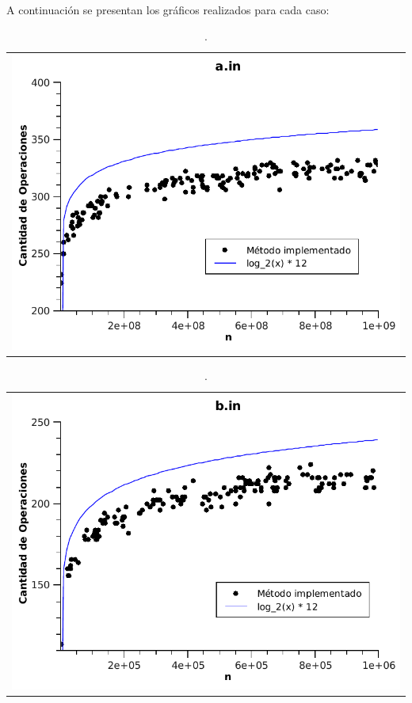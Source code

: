 \paragraph{}
A continuación se presentan los gráficos realizados para cada caso:

	\begin{table}[h!]
		\centering 
			\begin{tabular}{c}
				\includegraphics[scale = 0.8]{./../ej1/tests/a.pdf}
			\end{tabular}
			\caption{.}
			\label{grafico1} 
	\end{table}

	\begin{table}[h!]
		\centering 
			\begin{tabular}{c}
				\includegraphics[scale = 0.8]{./../ej1/tests/b.pdf}
			\end{tabular}
			\caption{.} 
			\label{grafico2} 
	\end{table}

